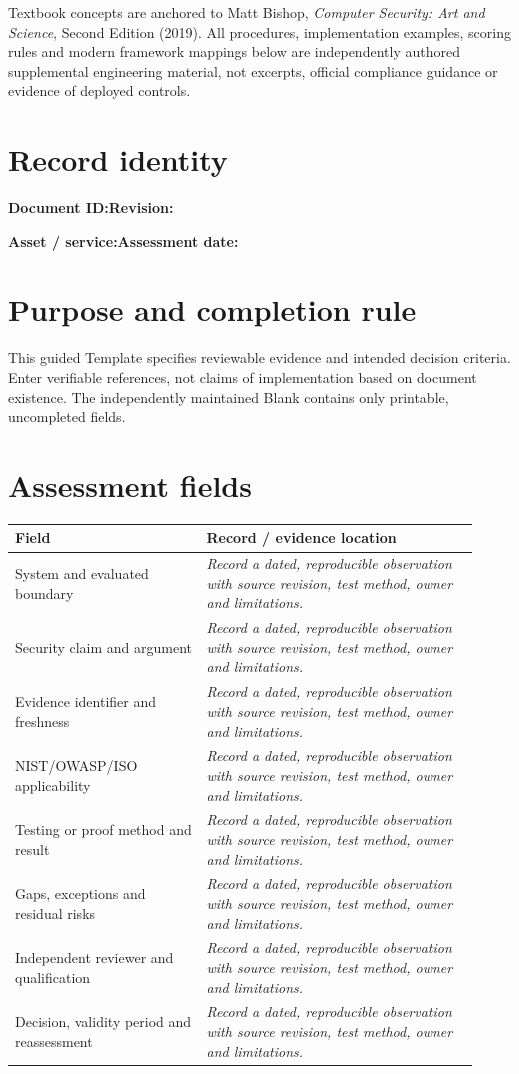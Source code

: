 \documentclass[10pt,letterpaper]{article}
\begin{document}
\makedoctocpage
\begin{notebox}
Textbook concepts are anchored to Matt Bishop, \emph{Computer Security: Art and Science}, Second Edition (2019). All procedures, implementation examples, scoring rules and modern framework mappings below are independently authored supplemental engineering material, not excerpts, official compliance guidance or evidence of deployed controls.
\end{notebox}
\section{Record identity}
\textbf{Document ID:}\enspace\hrulefill\quad\textbf{Revision:}\enspace\hrulefill
\par\medskip\textbf{Asset / service:}\enspace\hrulefill\quad\textbf{Assessment date:}\enspace\hrulefill
\section{Purpose and completion rule}
This guided Template specifies reviewable evidence and intended decision criteria. Enter verifiable references, not claims of implementation based on document existence. The independently maintained Blank contains only printable, uncompleted fields.
\section{Assessment fields}
\renewcommand{\arraystretch}{1.8}
\begin{longtable}{@{}p{0.38\linewidth}p{0.54\linewidth}@{}}
\toprule\textbf{Field}&\textbf{Record / evidence location}\\\midrule\endhead
System and evaluated boundary & \emph{Record a dated, reproducible observation with source revision, test method, owner and limitations.}\\\midrule
Security claim and argument & \emph{Record a dated, reproducible observation with source revision, test method, owner and limitations.}\\\midrule
Evidence identifier and freshness & \emph{Record a dated, reproducible observation with source revision, test method, owner and limitations.}\\\midrule
NIST/OWASP/ISO applicability & \emph{Record a dated, reproducible observation with source revision, test method, owner and limitations.}\\\midrule
Testing or proof method and result & \emph{Record a dated, reproducible observation with source revision, test method, owner and limitations.}\\\midrule
Gaps, exceptions and residual risks & \emph{Record a dated, reproducible observation with source revision, test method, owner and limitations.}\\\midrule
Independent reviewer and qualification & \emph{Record a dated, reproducible observation with source revision, test method, owner and limitations.}\\\midrule
Decision, validity period and reassessment & \emph{Record a dated, reproducible observation with source revision, test method, owner and limitations.}\\\midrule
\bottomrule\end{longtable}
\end{document}
